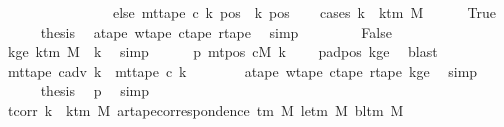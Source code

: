 \begin{isabellebody}
\ \ \ \ \ \ \ \ \ \ \ \ \ \ \ \ else\ mt{\isacharunderscore}{\kern0pt}tape\ c{\isacharprime}{\kern0pt}\ k\ pos{\isacharparenright}{\kern0pt}{\isachardoublequoteclose}\ \ k\ pos\isanewline
\ \ \isamarkupfalse%
\ {\isacharparenleft}{\kern0pt}cases\ {\isachardoublequoteopen}k\ {\isacharless}{\kern0pt}\ k{\isacharunderscore}{\kern0pt}tm\ M{\isachardoublequoteclose}{\isacharparenright}{\kern0pt}\isanewline
\ \ \ \ \isamarkupfalse%
\ True\isanewline
\ \ \ \ \isamarkupfalse%
\ {\isacharquery}{\kern0pt}thesis\ \isamarkupfalse%
\ a{\isacharunderscore}{\kern0pt}tape\ w{\isacharunderscore}{\kern0pt}tape\ c{\isacharunderscore}{\kern0pt}tape\ r{\isacharunderscore}{\kern0pt}tape\ \isamarkupfalse%
\ simp\isanewline
\ \ \isamarkupfalse%
\isanewline
\ \ \ \ \isamarkupfalse%
\ False\isanewline
\ \ \ \ \isamarkupfalse%
\ kge{\isacharcolon}{\kern0pt}\ {\isachardoublequoteopen}k{\isacharunderscore}{\kern0pt}tm\ M\ {\isasymle}\ k{\isachardoublequoteclose}\ \isamarkupfalse%
\ simp\isanewline
\ \ \ \ \isamarkupfalse%
\ p{}{\isacharcolon}{\kern0pt}\ {\isachardoublequoteopen}mt{\isacharunderscore}{\kern0pt}pos\ cM\ k\ {\isacharequal}{\kern0pt}\ {}{\isachardoublequoteclose}\ \isamarkupfalse%
\ padpos{}\ kge\ \isamarkupfalse%
\ blast\isanewline
\ \ \ \ \isamarkupfalse%
\ {\isachardoublequoteopen}mt{\isacharunderscore}{\kern0pt}tape\ c{\isacharunderscore}{\kern0pt}adv\ k\ {\isacharequal}{\kern0pt}\ mt{\isacharunderscore}{\kern0pt}tape\ c{\isacharprime}{\kern0pt}\ k{\isachardoublequoteclose}\isanewline
\ \ \ \ \ \ \isamarkupfalse%
\ a{\isacharunderscore}{\kern0pt}tape\ w{\isacharunderscore}{\kern0pt}tape\ c{\isacharunderscore}{\kern0pt}tape\ r{\isacharunderscore}{\kern0pt}tape\ kge\ \isamarkupfalse%
\ simp\isanewline
\ \ \ \ \isamarkupfalse%
\ {\isacharquery}{\kern0pt}thesis\ \isamarkupfalse%
\ p{}\ \isamarkupfalse%
\ simp\isanewline
\ \ \isamarkupfalse%
\isanewline
\ \ \isamarkupfalse%
\ tcorr{\isacharunderscore}{\kern0pt}{}{\isacharcolon}{\kern0pt}\ {\isachardoublequoteopen}{\isasymforall}k\ {\isacharless}{\kern0pt}\ k{\isacharunderscore}{\kern0pt}tm\ M{\isachardot}{\kern0pt}\ ar{\isacharunderscore}{\kern0pt}tape{\isacharunderscore}{\kern0pt}correspondence\ {\isacharparenleft}{\kern0pt}{\isasymGamma}{\isacharunderscore}{\kern0pt}tm\ M{\isacharparenright}{\kern0pt}\ {\isacharparenleft}{\kern0pt}le{\isacharunderscore}{\kern0pt}tm\ M{\isacharparenright}{\kern0pt}\ {\isacharparenleft}{\kern0pt}bl{\isacharunderscore}{\kern0pt}tm\ M{\isacharparenright}{\kern0pt}\isanewline

\end{isabellebody}
